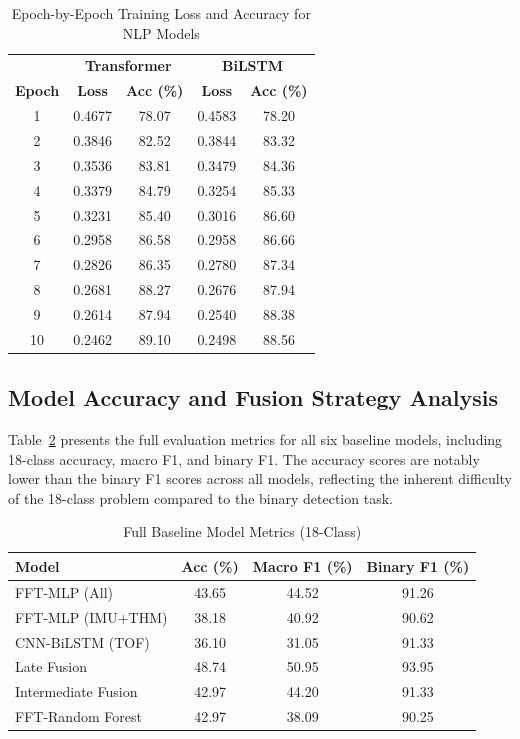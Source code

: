 \documentclass[conference]{IEEEtran}
\begin{document}
\begin{table}[!htbp]
\caption{Epoch-by-Epoch Training Loss and Accuracy for NLP Models}
\label{tab:training}
\centering
\begin{tabular}{ccccc}
\hline
 & \multicolumn{2}{c}{\textbf{Transformer}} & \multicolumn{2}{c}{\textbf{BiLSTM}} \\
\textbf{Epoch} & \textbf{Loss} & \textbf{Acc (\%)} & \textbf{Loss} & \textbf{Acc (\%)} \\
\hline
1  & 0.4677 & 78.07 & 0.4583 & 78.20 \\
2  & 0.3846 & 82.52 & 0.3844 & 83.32 \\
3  & 0.3536 & 83.81 & 0.3479 & 84.36 \\
4  & 0.3379 & 84.79 & 0.3254 & 85.33 \\
5  & 0.3231 & 85.40 & 0.3016 & 86.60 \\
6  & 0.2958 & 86.58 & 0.2958 & 86.66 \\
7  & 0.2826 & 86.35 & 0.2780 & 87.34 \\
8  & 0.2681 & 88.27 & 0.2676 & 87.94 \\
9  & 0.2614 & 87.94 & 0.2540 & 88.38 \\
10 & 0.2462 & 89.10 & 0.2498 & 88.56 \\
\hline
\end{tabular}
\end{table}

\subsection{Model Accuracy and Fusion Strategy Analysis}

Table~\ref{tab:full_metrics} presents the full evaluation metrics
for all six baseline models, including 18-class accuracy, macro
F1, and binary F1. The accuracy scores are notably lower than
the binary F1 scores across all models, reflecting the inherent
difficulty of the 18-class problem compared to the binary
detection task.

\begin{table}[!htbp]
\caption{Full Baseline Model Metrics (18-Class)}
\label{tab:full_metrics}
\centering
\begin{tabular}{lccc}
\hline
\textbf{Model} & \textbf{Acc (\%)} & \textbf{Macro F1 (\%)} & \textbf{Binary F1 (\%)} \\
\hline
FFT-MLP (All)        & 43.65 & 44.52 & 91.26 \\
FFT-MLP (IMU+THM)    & 38.18 & 40.92 & 90.62 \\
CNN-BiLSTM (TOF)     & 36.10 & 31.05 & 91.33 \\
Late Fusion          & 48.74 & 50.95 & 93.95 \\
Intermediate Fusion  & 42.97 & 44.20 & 91.33 \\
FFT-Random Forest    & 42.97 & 38.09 & 90.25 \\
\hline
\end{tabular}
\end{table}
\end{document}

